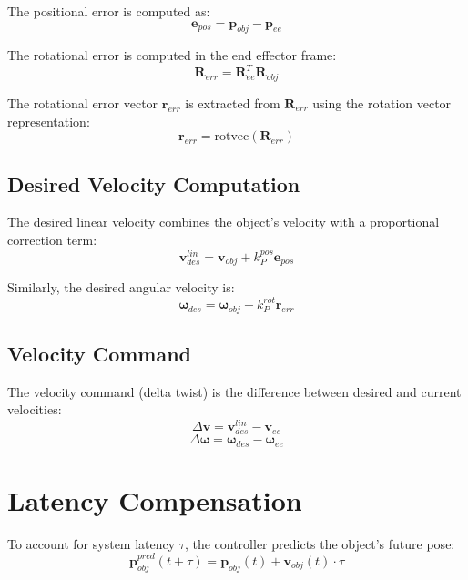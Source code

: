 \documentclass{article}
\begin{document}
The positional error is computed as:
\begin{equation}
    \bm{e}_{pos} = \bm{p}_{obj} - \bm{p}_{ee}
\end{equation}

The rotational error is computed in the end effector frame:
\begin{equation}
    \bm{R}_{err} = \bm{R}_{ee}^T \bm{R}_{obj}
\end{equation}

The rotational error vector $\bm{r}_{err}$ is extracted from $\bm{R}_{err}$ using the rotation vector representation:
\begin{equation}
    \bm{r}_{err} = \text{rotvec}(\bm{R}_{err})
\end{equation}

\subsection{Desired Velocity Computation}

The desired linear velocity combines the object's velocity with a proportional correction term:
\begin{equation}
    \bm{v}_{des}^{lin} = \bm{v}_{obj} + k_P^{pos} \bm{e}_{pos}
\end{equation}

Similarly, the desired angular velocity is:
\begin{equation}
    \bm{\omega}_{des} = \bm{\omega}_{obj} + k_P^{rot} \bm{r}_{err}
\end{equation}

\subsection{Velocity Command}

The velocity command (delta twist) is the difference between desired and current velocities:
\begin{equation}
    \Delta \bm{v} = \bm{v}_{des}^{lin} - \bm{v}_{ee}
\end{equation}
\begin{equation}
    \Delta \bm{\omega} = \bm{\omega}_{des} - \bm{\omega}_{ee}
\end{equation}

\section{Latency Compensation}

To account for system latency $\tau$, the controller predicts the object's future pose:
\begin{equation}
    \bm{p}_{obj}^{pred}(t + \tau) = \bm{p}_{obj}(t) + \bm{v}_{obj}(t) \cdot \tau
\end{equation}
\end{document}
